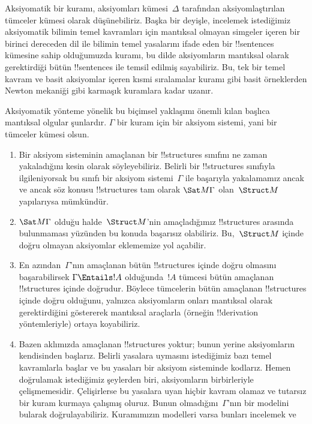 \documentclass[../../../include/open-logic-section]{subfiles}
\begin{document}
\begin{explain}
Aksiyomatik bir kuramı, aksiyomları kümesi~$\Delta$ tarafından
aksiyomlaştırılan tümceler kümesi olarak düşünebiliriz. Başka bir
deyişle, incelemek istediğimiz aksiyomatik bilimin temel kavramları
için mantıksal olmayan simgeler içeren bir birinci dereceden dil ile
bilimin temel yasalarını ifade eden bir !!{sentence}s kümesine sahip
olduğumuzda kuramı, bu dilde aksiyomların mantıksal olarak gerektirdiği
bütün !!{sentence}s ile temsil edilmiş sayabiliriz. Bu, tek bir temel
kavram ve basit aksiyomlar içeren kısmi sıralamalar kuramı gibi basit
örneklerden Newton mekaniği gibi karmaşık kuramlara kadar uzanır.

Aksiyomatik yönteme yönelik bu biçimsel yaklaşımı önemli kılan başlıca
mantıksal olgular şunlardır. $\Gamma$ bir kuram için bir aksiyom
sistemi, yani bir tümceler kümesi olsun.
\begin{enumerate}
\item Bir aksiyom sisteminin amaçlanan bir !!{structure}s sınıfını ne
  zaman yakaladığını kesin olarak söyleyebiliriz. Belirli bir
  !!{structure}s sınıfıyla ilgileniyorsak bu sınıfı bir aksiyom
  sistemi~$\Gamma$ ile başarıyla yakalamamız ancak ve ancak söz konusu
  !!{structure}s tam olarak $\Sat M\Gamma$ olan~$\Struct M$ yapılarıysa
  mümkündür.
\item $\Sat M\Gamma$ olduğu halde~$\Struct M$'nin amaçladığımız
  !!{structure}s arasında bulunmaması yüzünden bu konuda başarısız
  olabiliriz. Bu,~$\Struct M$ içinde doğru olmayan aksiyomlar
  eklememize yol açabilir.
\item En azından~$\Gamma$'nın amaçlanan bütün !!{structure}s içinde
  doğru olmasını başarabilirsek $\Gamma\Entails !A$ olduğunda~$!A$
  tümcesi bütün amaçlanan !!{structure}s içinde doğrudur. Böylece
  tümcelerin bütün amaçlanan !!{structure}s içinde doğru olduğunu,
  yalnızca aksiyomların onları mantıksal olarak gerektirdiğini
  göstererek mantıksal araçlarla (örneğin !!{derivation} yöntemleriyle)
  ortaya koyabiliriz.
\item Bazen aklımızda amaçlanan !!{structure}s yoktur; bunun yerine
  aksiyomların kendisinden başlarız. Belirli yasalara uymasını
  istediğimiz bazı temel kavramlarla başlar ve bu yasaları bir aksiyom
  sisteminde kodlarız. Hemen doğrulamak istediğimiz şeylerden biri,
  aksiyomların birbirleriyle çelişmemesidir. Çelişirlerse bu yasalara
  uyan hiçbir kavram olamaz ve tutarsız bir kuram kurmaya çalışmış
  oluruz. Bunun olmadığını~$\Gamma$'nın bir modelini bularak
  doğrulayabiliriz. Kuramımızın modelleri varsa bunları incelemek ve

\end{enumerate}
\end{explain}
\end{document}
